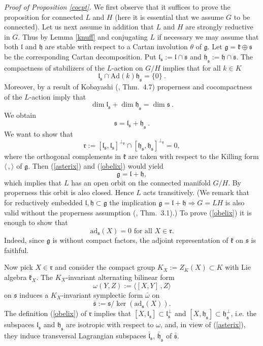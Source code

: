\documentclass[10]{amsart}
\theoremstyle{remark}
\theoremstyle{definition}
\numberwithin{equation}{section}
\newcommand{\Ad}{\text{Ad}}
\newcommand{\ad}{\text{ad}}
\newcommand{\fg}{{\mathfrak g}}
\newcommand{\fh}{{\mathfrak h}}
\newcommand{\fk}{{\mathfrak k}}
\newcommand{\fl}{{\mathfrak l}}
\newcommand{\fr}{{\mathfrak r}}
\newcommand{\fs}{{\mathfrak s}}
\newcommand{\beu}{\begin{equation*}}
\newcommand{\IP}[2]{\langle#1\,, #2\rangle}     %
\newcommand{\defn}{{:=}}
\begin{document}
{\noindent
{\it Proof of Proposition \ref{cocpt}.}
We first observe that it suffices to prove the proposition for connected $L$ and $H$ (here it is essential that we assume $G$ to be connected). Let us next assume in addition that
$L$ and $H$ are strongly reductive in $G$. Thus by Lemma \ref{knuff} and conjugating $L$ if necessary we may assume that both $\fl$ and $\fh$ are stable with respect to a Cartan
involution $\theta$ of $\fg$. Let $\fg=\fk\oplus\fs$ be the corresponding Cartan decomposition.
Put $\fl_\fs\defn\fl\cap\fs$ and $\fh_\fs\defn\fh\cap\fs$. The compactness of stabilizers of the $L$-action on $G/H$ implies that for all $k\in K$
\begin{equation}\label{knax}\fl_\fs\cap \Ad(k)\fh_\fs = \{0\}\ .
\end{equation}
Moreover, by a result of Kobayashi (\cite{Kos89}, Thm.~4.7) properness and cocompactness of the $L$-action imply that
$$ \dim \fl_\fs +\dim \fh_\fs =\dim \fs\ .$$
We obtain
%
\begin{equation} \label{asterix}
\fs=\fl_\fs+ \fh_\fs\ .
\end{equation}
%
We want to show that
\begin{equation} \label{obelix}
\fr\defn[\fl_\fs,\fl_\fs]^{\perp_\fk}\cap[\fh_\fs,\fh_\fs]^{\perp_\fk}=0,
\end{equation}
%
where the orthogonal complements in $\fk$ are taken with respect to the Killing form $\IP{}{}$ of $\fg$.
Then (\ref{asterix}) and (\ref{obelix}) would yield
%
\beu 
\fg=\fl+\fh,
\end{equation*}
%
which implies that $L$ has an open orbit on the connected manifold $G/H$. By properness this orbit is also closed. Hence $L$ acts transitively.
(We remark that for reductively embedded $\fl,\fh\subset\fg$ the implication $\fg=\fl+\fh \Rightarrow G=LH$ is also valid without the properness assumption (\cite{Oni69}, Thm.~3.1).) 
To prove (\ref{obelix}) it is enough to show that 
%
\begin{equation}\label{keystep}
\ad_{\fs}(X)=0\text{ for all }X\in\fr.
\end{equation}
%
Indeed, since $\fg$ is without compact factors, the adjoint representation of $\fk$ on $\fs$ is faithful. 

Now pick $X\in\fr$ and consider the compact group $K_X\defn Z_K(X)\subset K$ with Lie algebra $\fk_X$. The $K_X$-invariant alternating bilinear form 
%
\beu
\omega(Y,Z)\defn\IP{ [X,Y]}{Z}
\end{equation*}
%
on $\fs$ induces a $K_X$-invariant symplectic form $\bar\omega$ on 
%
\beu
\bar\fs\defn\fs/\ker(\ad_{\fs}(X)).
\end{equation*}
% 
The definition (\ref{obelix}) of $\fr$ implies that $[X,\fl_\fs]\subset \fl_\fs^\perp$ and $[X,\fh_\fs]\subset \fh_\fs^\perp$, i.e. the subspaces $\fl_{\fs}$ and $\fh_{\fs}$ are 
isotropic with respect to $\omega$, and, in view of (\ref{asterix}), they induce transversal Lagrangian subspaces $\bar\fl_{\fs}$, $\bar\fh_{\fs}$ of $\bar\fs$. 

}
\end{document}
